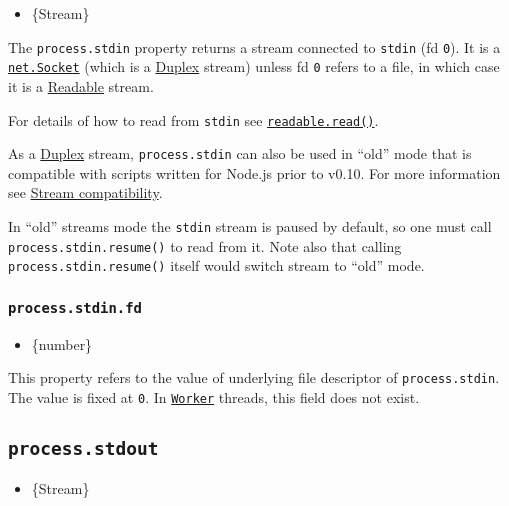 \begin{itemize}
\tightlist
\item
  \{Stream\}
\end{itemize}

The \texttt{process.stdin} property returns a stream connected to
\texttt{stdin} (fd \texttt{0}). It is a
\href{net.md\#class-netsocket}{\texttt{net.Socket}} (which is a
\href{stream.md\#duplex-and-transform-streams}{Duplex} stream) unless fd
\texttt{0} refers to a file, in which case it is a
\href{stream.md\#readable-streams}{Readable} stream.

For details of how to read from \texttt{stdin} see
\href{stream.md\#readablereadsize}{\texttt{readable.read()}}.

As a \href{stream.md\#duplex-and-transform-streams}{Duplex} stream,
\texttt{process.stdin} can also be used in ``old'' mode that is
compatible with scripts written for Node.js prior to v0.10. For more
information see
\href{stream.md\#compatibility-with-older-nodejs-versions}{Stream
compatibility}.

In ``old'' streams mode the \texttt{stdin} stream is paused by default,
so one must call \texttt{process.stdin.resume()} to read from it. Note
also that calling \texttt{process.stdin.resume()} itself would switch
stream to ``old'' mode.

\subsubsection{\texorpdfstring{\texttt{process.stdin.fd}}{process.stdin.fd}}\label{process.stdin.fd}

\begin{itemize}
\tightlist
\item
  \{number\}
\end{itemize}

This property refers to the value of underlying file descriptor of
\texttt{process.stdin}. The value is fixed at \texttt{0}. In
\href{worker_threads.md\#class-worker}{\texttt{Worker}} threads, this
field does not exist.

\subsection{\texorpdfstring{\texttt{process.stdout}}{process.stdout}}\label{process.stdout}

\begin{itemize}
\tightlist
\item
  \{Stream\}
\end{itemize}

